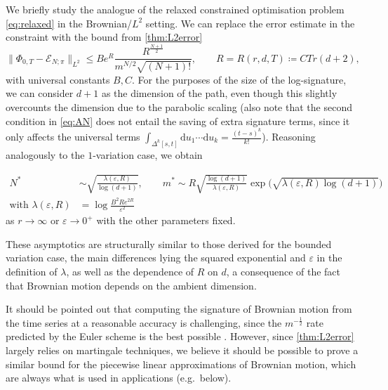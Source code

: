\documentclass{article}
\def\d{\mathrm{d}}
\def\eps{\varepsilon}
\def\cE{\mathcal{E}}
\numberwithin{equation}{section}
\theoremstyle{definition}
\theoremstyle{remark}
\begin{document}
We briefly study the analogue of the relaxed constrained optimisation problem \eqref{eq:relaxed} in the Brownian/$L^2$ setting. We can replace the error estimate in the constraint with the bound from \autoref{thm:L2error}
\[
\| \Phi_{0,T} - \cE_{N;\pi} \|_{L^2} \leq B e^R \frac{R^{\frac{N+1}{2}}}{m^{N/2} \sqrt{(N+1)!}},\qquad R = R(r,d,T) \coloneqq CTr(d+2),
\]
with universal constants $B, C$. For the purposes of the size of the log-signature, we can consider $d+1$ as the dimension of the path, even though this slightly overcounts the dimension due to the parabolic scaling (also note that the second condition in \eqref{eq:AN} does not entail the saving of extra signature terms, since it only affects the universal terms $\int_{\Delta^k[s,t]} \d u_1 \cdots \d u_k = \frac{(t-s)^k}{k!}$). Reasoning analogously to the $1$-variation case, we obtain
\begin{proposition}
\begin{align*}
	N^* &\sim \sqrt{\frac{\lambda(\eps,R)}{\log(d+1)}}, \qquad m^* \sim R \sqrt{\frac{\log (d+1)}{\lambda(\eps,R)}} \exp\big( \sqrt{\lambda(\eps,R) \log(d+1)} \big) \\
	\text{with } \lambda(\eps, R) &= \log \frac{B^2Re^{2R}}{\eps^2}
\end{align*}
as $r \to \infty$ or $\eps \to 0^+$ with the other parameters fixed.
\end{proposition}
These asymptotics are structurally similar to those derived for the bounded variation case, the main differences lying the squared exponential and $\eps$ in the definition of $\lambda$, as well as the dependence of $R$ on $d$, a consequence of the fact that Brownian motion depends on the ambient dimension.

\begin{remark}
It should be pointed out that computing the signature of Brownian motion from the time series at a reasonable accuracy is challenging, since the $m^{-\frac 12}$ rate predicted by the Euler scheme is the best possible \cite{CC80}. However, since \autoref{thm:L2error} largely relies on martingale techniques, we believe it should be possible to prove a similar bound for the piecewise linear approximations of Brownian motion, which are always what is used in applications (e.g.\ below).
\end{remark}
\end{document}

